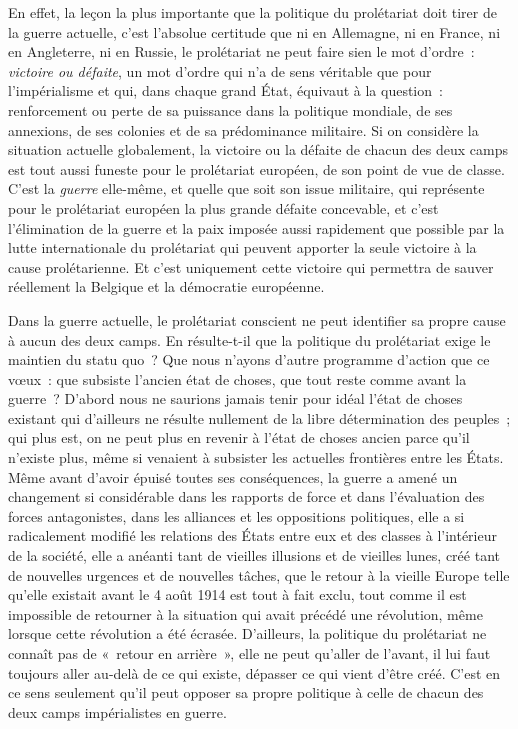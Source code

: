 \documentclass[french,twoside]{book} %
\begin{document}
En effet, la leçon la plus importante que la politique du prolétariat doit tirer de la guerre actuelle, c’est l’absolue certitude que ni en Allemagne, ni en France, ni en Angleterre, ni en Russie, le prolétariat ne peut faire sien le mot d’ordre : \emph{victoire ou défaite}, un mot d’ordre qui n’a de sens véritable que pour l’impérialisme et qui, dans chaque grand État, équivaut à la question : renforcement ou perte de sa puissance dans la politique mondiale, de ses annexions, de ses colonies et de sa prédominance militaire. Si on considère la situation actuelle globalement, la victoire ou la défaite de chacun des deux camps est tout aussi funeste pour le prolétariat européen, de son point de vue de classe. C'est la \emph{guerre} elle-même, et quelle que soit son issue militaire, qui représente pour le prolétariat européen la plus grande défaite concevable, et c’est l’élimination de la guerre et la paix imposée aussi rapidement que possible par la lutte internationale du prolétariat qui peuvent apporter la seule victoire à la cause prolétarienne. Et c’est uniquement cette victoire qui permettra de sauver réellement la Belgique et la démocratie européenne.\par
Dans la guerre actuelle, le prolétariat conscient ne peut identifier sa propre cause à aucun des deux camps. En résulte-t-il que la politique du prolétariat exige le maintien du statu quo ? Que nous n’ayons d’autre programme d’action que ce vœux : que subsiste l’ancien état de choses, que tout reste comme avant la guerre ? D'abord nous ne saurions jamais tenir pour idéal l’état de choses existant qui d’ailleurs ne résulte nullement de la libre détermination des peuples ; qui plus est, on ne peut plus en revenir à l’état de choses ancien parce qu’il n’existe plus, même si venaient à subsister les actuelles frontières entre les États. Même avant d’avoir épuisé toutes ses conséquences, la guerre a amené un changement si considérable dans les rapports de force et dans l’évaluation des forces antagonistes, dans les alliances et les oppositions politiques, elle a si radicalement modifié les relations des États entre eux et des classes à l’intérieur de la société, elle a anéanti tant de vieilles illusions et de vieilles lunes, créé tant de nouvelles urgences et de nouvelles tâches, que le retour à la vieille Europe telle qu’elle existait avant le 4 août 1914 est tout à fait exclu, tout comme il est impossible de retourner à la situation qui avait précédé une révolution, même lorsque cette révolution a été écrasée. D'ailleurs, la politique du prolétariat ne connaît pas de « retour en arrière », elle ne peut qu’aller de l’avant, il lui faut toujours aller au-delà de ce qui existe, dépasser ce qui vient d’être créé. C'est en ce sens seulement qu’il peut opposer sa propre politique à celle de chacun des deux camps impérialistes en guerre.\par
\end{document}
